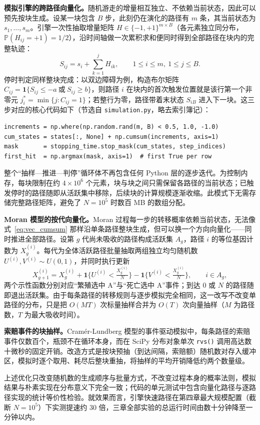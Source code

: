 \smallskip
\noindent\textbf{模拟引擎的跨路径向量化。}\quad 随机游走的增量相互独立、不依赖当前状态，因此可以预先按块生成。设某一块包含 $B$ 步，此刻仍在演化的路径有 $m$ 条，其当前状态为 $s_1, \dots, s_m$。引擎一次性抽取增量矩阵 $H \in \{-1, +1\}^{m \times B}$（各元素独立同分布，$\mathbb{P}(H_{ij} = +1) = 1/2$），沿时间轴做一次累积求和便同时得到全部路径在块内的完整轨迹：
\begin{equation}\label{eq:vec_cumsum}
  S_{ij} = s_i + \sum_{k=1}^{j} H_{ik}, \qquad 1 \leqslant i \leqslant m,\ 1 \leqslant j \leqslant B.
\end{equation}
停时判定同样整块完成：以双边障碍为例，构造布尔矩阵 $C_{ij} = \mathbf{1}\{S_{ij} \leqslant -a \ \text{或}\ S_{ij} \geqslant b\}$，则路径 $i$ 在块内的首次触发位置就是该行第一个非零元 $j_i^{\ast} = \min\{j: C_{ij} = 1\}$；若整行为零，路径带着末状态 $S_{iB}$ 进入下一块。这三步对应的核心代码如下（节选自 \texttt{simulation.py}，略去索引簿记）：
\begin{lstlisting}
increments = np.where(np.random.rand(m, B) < 0.5, 1.0, -1.0)
cum_states = states[:, None] + np.cumsum(increments, axis=1)
mask       = stopping_time.stop_mask(cum_states, step_indices)
first_hit  = np.argmax(mask, axis=1)  # first True per row
\end{lstlisting}
整个``抽样—推进—判停''循环体不再包含任何 Python 层的逐步迭代。为控制内存，每块限制在约 $4 \times 10^6$ 个元素，块与块之间只需保留各路径的当前状态；已触发停时的路径随即从活跃集中移除，后续块的计算规模逐渐收缩。此模式下无需存储完整路径矩阵，避免了 $N = 10^5$ 时数百 MB 的数组分配。

\smallskip
\noindent\textbf{Moran 模型的按代向量化。}\quad Moran 过程每一步的转移概率依赖当前状态，无法像式~\eqref{eq:vec_cumsum} 那样沿单条路径整块生成，但可以换一个方向向量化——同时推进全部路径。设第 $g$ 代尚未吸收的路径构成活跃集 $A_g$，路径 $i$ 的等位基因计数为 $X_g^{(i)}$。每代为全体活跃路径批量抽取两组独立均匀随机数 $U^{(i)}, V^{(i)} \sim U(0,1)$，并同时执行更新
\begin{equation}
  X_{g+1}^{(i)} = X_g^{(i)}
  + \mathbf{1}\Big\{U^{(i)} < \tfrac{X_g^{(i)}}{N}\Big\}
  - \mathbf{1}\Big\{V^{(i)} < \tfrac{X_g^{(i)}}{N}\Big\},
  \qquad i \in A_g,
\end{equation}
两个示性函数分别对应``繁殖选中 A''与``死亡选中 A''事件；到达 $0$ 或 $N$ 的路径随即退出活跃集。由于每条路径的转移规则与逐步模拟完全相同，这一改写不改变单路径的分布，只是把 $O(MT)$ 次标量抽样合并为 $O(T)$ 次向量抽样（$M$ 为路径数，$T$ 为最大吸收时间）。

\smallskip
\noindent\textbf{索赔事件的块抽样。}\quad Cram\'{e}r-Lundberg 模型的事件驱动模拟中，每条路径的索赔事件仅数百个，瓶颈不在循环本身，而在 SciPy 分布对象单次 \texttt{rvs()} 调用高达数十微秒的固定开销。改造方式是按块预抽（到达间隔，索赔额）随机数对存入缓冲区，模拟时逐个取用、耗尽后整块重抽，将抽样的平均开销降低约两个数量级。

\smallskip
上述优化只改变随机数的生成顺序与批量方式，不改变过程本身的概率法则，模拟结果与朴素实现在分布意义下完全一致；代码的单元测试中包含向量化路径与逐路径实现的统计等价性检验。就效果而言，引擎快速路径在第四章最大规模配置（截断 $N = 10^5$）下实测提速约 30 倍，三章全部实验的总运行时间由数十分钟降至一分钟以内。
